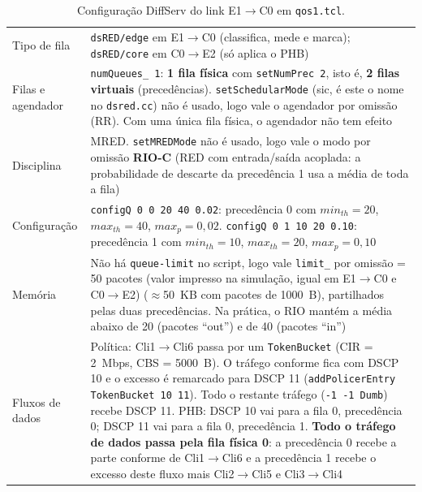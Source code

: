 \IfFileExists{llncs.cls}{\documentclass[runningheads]{llncs}}{\documentclass{article}}
\newcommand{\esp}[1]{#1}
\begin{document}
\begin{table}[t]\centering\caption{Configuração DiffServ do link E1$\rightarrow$C0 em \texttt{qos1.tcl}.}\label{tab:c1}
\scriptsize
\begin{tabular}{p{2.6cm}p{8.6cm}}\toprule
Tipo de fila & \texttt{dsRED/edge} em E1$\rightarrow$C0 (classifica, mede e marca); \texttt{dsRED/core} em C0$\rightarrow$E2 (só aplica o PHB)\\
Filas e agendador & \texttt{numQueues\_ 1}: \textbf{1 fila física} com \texttt{setNumPrec 2}, isto é, \textbf{2 filas virtuais} (precedências). \texttt{setSchedularMode} (sic, é este o nome no \texttt{dsred.cc}) não é usado, logo vale o agendador por omissão (RR). Com uma única fila física, o agendador não tem efeito\\
Disciplina & MRED. \texttt{setMREDMode} não é usado, logo vale o modo por omissão \textbf{RIO-C} (RED com entrada/saída acoplada: a probabilidade de descarte da precedência 1 usa a média de toda a fila)\\
Configuração & \texttt{configQ 0 0 20 40 0.02}: precedência 0 com $min_{th}=20$, $max_{th}=40$, $max_p=0{,}02$. \texttt{configQ 0 1 10 20 0.10}: precedência 1 com $min_{th}=10$, $max_{th}=20$, $max_p=0{,}10$\\
Memória & Não há \texttt{queue-limit} no script, logo vale \texttt{limit\_} por omissão = \esp{50 pacotes} (valor impresso na simulação, igual em E1$\rightarrow$C0 e C0$\rightarrow$E2) ($\approx$50~KB com pacotes de 1000~B), partilhados pelas duas precedências. Na prática, o RIO mantém a média abaixo de 20 (pacotes ``out'') e de 40 (pacotes ``in'')\\
Fluxos de dados & Política: Cli1$\rightarrow$Cli6 passa por um \texttt{TokenBucket} (CIR = 2~Mbps, CBS = 5000~B). O tráfego conforme fica com DSCP 10 e o excesso é remarcado para DSCP 11 (\texttt{addPolicerEntry TokenBucket 10 11}). Todo o restante tráfego (\texttt{-1 -1 Dumb}) recebe DSCP 11. PHB: DSCP 10 vai para a fila 0, precedência 0; DSCP 11 vai para a fila 0, precedência 1. \textbf{Todo o tráfego de dados passa pela fila física 0}: a precedência 0 recebe a parte conforme de Cli1$\rightarrow$Cli6 e a precedência 1 recebe o excesso deste fluxo mais Cli2$\rightarrow$Cli5 e Cli3$\rightarrow$Cli4\\
\bottomrule\end{tabular}\end{table}
\end{document}
